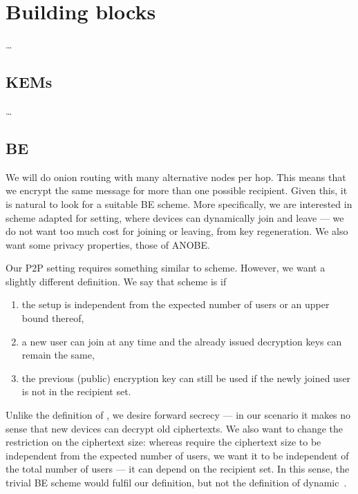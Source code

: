 \section{Building blocks}%
\label{BuildingBlocks}

\dots

\subsection{\Aclp*{KEM}}\label{KEM}

\dots

\subsection{\Acl*{BE}}\label{BE}

We will do onion routing with many alternative nodes per hop.
This means that we encrypt the same message for more than one possible 
recipient.
Given this, it is natural to look for a suitable \ac{BE} scheme.
More specifically, we are interested in  scheme adapted for  
setting, where devices can dynamically join and leave --- \ie we do not want too 
much cost for joining or leaving, \eg from key regeneration.
We also want some privacy properties, \eg those of \ac{ANOBE}.


Our \ac{P2P} setting requires something similar to  scheme.
However, we want a slightly different definition.
We say that  scheme is  if
\begin{enumerate}
  \item the setup is independent from the expected number of users or an upper 
    bound thereof,
  \item a new user can join at any time and the already issued decryption keys 
    can remain the same,
  \item the previous (public) encryption key can still be used if the newly 
    joined user is not in the recipient set.
\end{enumerate}
Unlike the definition of \textcite{DynamicBroadcastEncryption}, we desire 
forward secrecy --- in our scenario it makes no sense that new devices can 
decrypt old ciphertexts.
We also want to change the restriction on the ciphertext size:
whereas \textcite{DynamicBroadcastEncryption} require the ciphertext size to be 
independent from the expected number of users, we want it to be independent of 
the total number of users --- \ie it can depend on the recipient set.
In this sense, the trivial \ac{BE} scheme would fulfil our definition, but not 
the definition of dynamic~\cite{DynamicBroadcastEncryption}.

